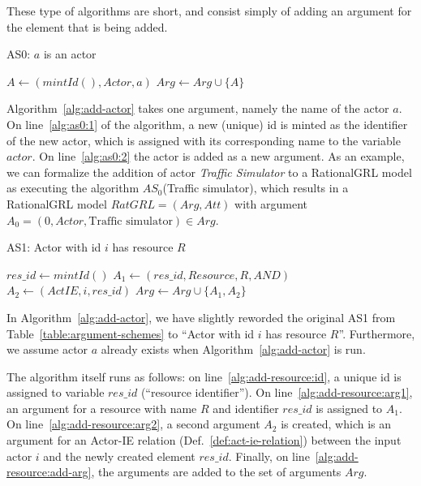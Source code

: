 These type of algorithms are short, and consist simply of adding an argument for the element that is being added. 

\begin{algorithm}[h]
  \caption{AS0: $a$ is an actor}\label{alg:add-actor}
  \begin{algorithmic}[1]
    \State $A \leftarrow (mintId(), Actor, a)$ \label{alg:as0:1}
    \State $Arg\leftarrow Arg \cup \{A\}$\label{alg:as0:2}
    \EndProcedure
  \end{algorithmic}
\end{algorithm}

Algorithm~\ref{alg:add-actor} takes one argument, namely the name of the actor $a$. On line~\ref{alg:as0:1} of the algorithm, a new (unique) id is minted as the identifier of the new actor, which is assigned with its corresponding name to the variable $actor$. On line~\ref{alg:as0:2} the actor is added as a new argument. As an example, we can formalize the addition of actor \emph{Traffic Simulator} to a RationalGRL model as executing the algorithm $AS_0$(Traffic simulator), which results in a RationalGRL model $RatGRL=(Arg,Att)$ with argument $A_0 = (0, Actor, \text{Traffic simulator})\in Arg$.

\begin{algorithm}[h]
  \caption{AS1: Actor with id $i$ has resource $R$}\label{alg:add-resource}
  \begin{algorithmic}[1]
    \State $res\_id\gets mintId()$\label{alg:add-resource:id}
    \State $A_1\leftarrow (res\_id, Resource, R, AND)$\label{alg:add-resource:arg1}
    \State $A_2\leftarrow (ActIE, i, res\_id)$\label{alg:add-resource:arg2}
    \State $Arg\gets Arg\cup \{A_1,A_2\}$\label{alg:add-resource:add-arg}
    \EndProcedure
  \end{algorithmic}
\end{algorithm}

In Algorithm~\ref{alg:add-actor}, we have slightly reworded the original AS1 from Table~\ref{table:argument-schemes} to ``Actor with id $i$ has resource $R$''. Furthermore, we assume actor $a$ already exists when Algorithm~\ref{alg:add-actor} is run. 

The algorithm itself runs as follows: on line~\ref{alg:add-resource:id}, a unique id is assigned to variable $res\_id$ (``resource identifier''). On line~\ref{alg:add-resource:arg1}, an argument for a resource with name $R$ and identifier $res\_id$ is assigned to $A_1$. On line~\ref{alg:add-resource:arg2}, a second argument $A_2$ is created, which is an argument for an Actor-IE relation (Def.~\ref{def:act-ie-relation}) between the input actor $i$ and the newly created element $res\_id$. Finally, on line~\ref{alg:add-resource:add-arg}, the arguments are added to the set of arguments $Arg$.

